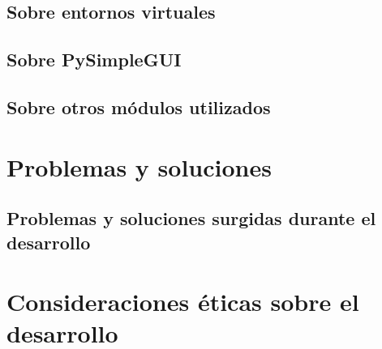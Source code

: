 \documentclass[11pt,fleqn]{book} %
\begin{document}
\section{Sobre entornos virtuales}

\section{Sobre PySimpleGUI}

\section{Sobre otros módulos utilizados}



\chapter{Problemas y soluciones}
\vspace*{1cm}

\section{Problemas y soluciones surgidas durante el desarrollo}




\chapter{Consideraciones éticas sobre el desarrollo}
\vspace*{1cm}



\end{document}
